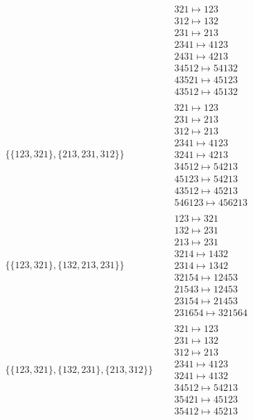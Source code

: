 \begin{tiny}
\begin{align}
\quad
&
\begin{matrix}
321 \mapsto 123\\312 \mapsto 132\\231 \mapsto 213\\2341 \mapsto 4123\\2431 \mapsto 4213\\34512 \mapsto 54132\\43521 \mapsto 45123\\43512 \mapsto 45132
\end{matrix}
\\
\{\{123, 321\}, \{213, 231, 312\}\}
\quad
&
\begin{matrix}
321 \mapsto 123\\231 \mapsto 213\\312 \mapsto 213\\2341 \mapsto 4123\\3241 \mapsto 4213\\34512 \mapsto 54213\\45123 \mapsto 54213\\43512 \mapsto 45213\\546123 \mapsto 456213
\end{matrix}
\\
\{\{123, 321\}, \{132, 213, 231\}\}
\quad
&
\begin{matrix}
123 \mapsto 321\\132 \mapsto 231\\213 \mapsto 231\\3214 \mapsto 1432\\2314 \mapsto 1342\\32154 \mapsto 12453\\21543 \mapsto 12453\\23154 \mapsto 21453\\231654 \mapsto 321564
\end{matrix}
\\
\{\{123, 321\}, \{132, 231\}, \{213, 312\}\}
\quad
&
\begin{matrix}
321 \mapsto 123\\231 \mapsto 132\\312 \mapsto 213\\2341 \mapsto 4123\\3241 \mapsto 4132\\34512 \mapsto 54213\\35421 \mapsto 45123\\35412 \mapsto 45213
\end{matrix}
\\

\end{align}
\end{tiny}
